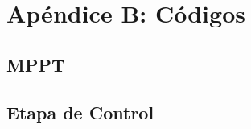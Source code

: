 \chapter{Apéndice B: Códigos}
\renewcommand{\thepage}{B-\arabic{page}}
\setcounter{page}{1}
    \section{MPPT}
    
        
        \label{Listing B.1}
        
    \section{Etapa de Control}
        
        \label{Listing B.2}
        
        
        \label{Listing B.3}

        
        \label{Listing B.4}